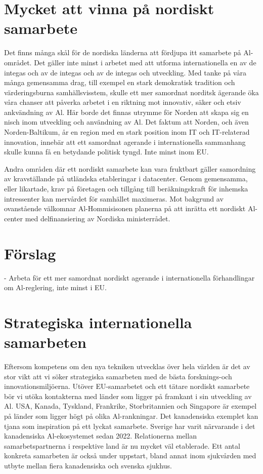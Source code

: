 {{{{{{{{{{{{{{{{\section*{Mycket att vinna på nordiskt samarbete} Det finns många skål för de nordiska länderna att fördjupa itt samarbete på Al-området. Det gäller inte minst i arbetet med att utforma internationella en av de integas och av de integas och av de integas och utveckling. Med tanke på våra många gemensamma drag, till exempel en stark demokratisk tradition och värderingsburna samhällsvisstem, skulle ett mer samordnat norditsk ägerande öka våra chanser att påverka arbetet i en riktning mot innovativ, säker och etsiv ankvändning av Al. Här borde det finnas utrymme för Norden att skapa sig en nisch inom utveckling och användning av Al. Det faktum att Norden, och även Norden-Baltikum, år en region med en stark position inom IT och IT-relaterad innovation, innebär att ett samordnat agerande i internationella sammanhang skulle kunna få en betydande politisk tyngd. Inte minst inom EU.

Andra områden där ett nordiskt samarbete kan vara fruktbart gäller samordning av kravställande på utländska etableringar i datacenter. Genom gemensamma, eller likartade, krav på företagen och tillgång till beräkningskraft för inhemska intressenter kan mervårdet för samhället maximeras.
Mot bakgrund av ovanstående välkomnar Al-Hommisisonen planerna på att inrätta ett nordiskt Al-center med delfinansiering av Nordiska ministerrådet.
\section*{Förslag}
- Arbeta för ett mer samordnat nordiskt agerande i internationella förhandlingar om Al-reglering, inte minst i EU.
\section*{Strategiska internationella samarbeten}
Eftersom kompetens om den nya tekniken utvecklas över hela världen är det av stor vikt att vi söker strategiska samarbeten med de bästa forsknings-och innovationsmiljöerna.
Utöver EU-samarbetet och ett tätare nordiskt samarbete bör vi utöka kontakterna med länder som ligger på framkant i sin utveckling av Al. USA, Kanada, Tyskland, Frankrike, Storbritannien och Singapore är exempel på länder som ligger högt på olika Al-rankningar. Det kanadensiska exemplet kan tjana som inspiration på ett lyckat samarbete. Sverige har varit närvarande i det kanadensiska Al-ekosystemet sedan 2022. Relationerna mellan samarbetspartnerna i respektive land är nu mycket väl etablerade. Ett antal konkreta samarbeten är också under uppstart, bland annat inom sjukvården med utbyte mellan fiera kanadensiska och svenska sjukhus.
}}}}}}}}}}}}}}}}
